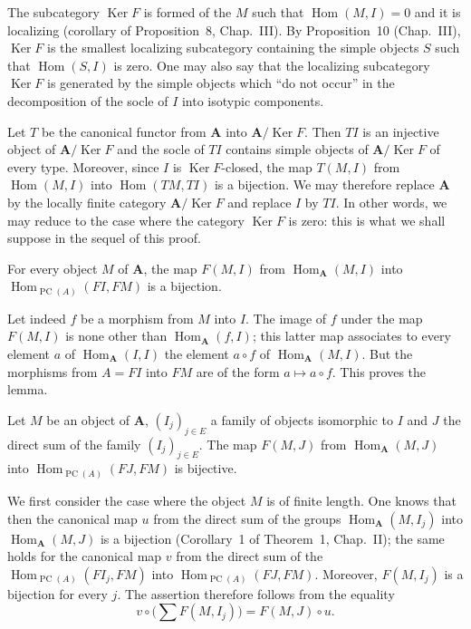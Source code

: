The subcategory $\operatorname{Ker}F$ is formed of the $M$ such that
$\operatorname{Hom}(M,I)=0$ and it is localizing (corollary of
Proposition~8, Chap.~III). By Proposition~10 (Chap.~III),
$\operatorname{Ker}F$ is the smallest localizing subcategory containing
the simple objects $S$ such that $\operatorname{Hom}(S,I)$ is zero. One
may also say that the localizing subcategory $\operatorname{Ker}F$ is
generated by the simple objects which ``do not occur'' in the
decomposition of the socle of $I$ into isotypic components.

Let $T$ be the canonical functor from $\mathbf{A}$ into
$\mathbf{A}/\operatorname{Ker}F$. Then $TI$ is an injective object of
$\mathbf{A}/\operatorname{Ker}F$ and the socle of $TI$ contains simple
objects of $\mathbf{A}/\operatorname{Ker}F$ of every type. Moreover,
since $I$ is $\operatorname{Ker}F$-closed, the map $T(M,I)$ from
$\operatorname{Hom}(M,I)$ into $\operatorname{Hom}(TM,TI)$ is a
bijection. We may therefore replace $\mathbf{A}$ by the locally finite
category $\mathbf{A}/\operatorname{Ker}F$ and replace $I$ by $TI$. In
other words, we may reduce to the case where the category
$\operatorname{Ker}F$ is zero: this is what we shall suppose in the
sequel of this proof.

\begin{lemma}
For every object $M$ of $\mathbf{A}$, the map $F(M,I)$ from
$\operatorname{Hom}_{\mathbf{A}}(M,I)$ into
$\operatorname{Hom}_{\operatorname{PC}(A)}(FI,FM)$ is a bijection.
\end{lemma}

Let indeed $f$ be a morphism from $M$ into $I$. The image of $f$ under
the map $F(M,I)$ is none other than $\operatorname{Hom}_{\mathbf{A}}(f,I)$;
this latter map associates to every element $a$ of
$\operatorname{Hom}_{\mathbf{A}}(I,I)$ the element $a\circ f$ of
$\operatorname{Hom}_{\mathbf{A}}(M,I)$. But the morphisms from $A=FI$
into $FM$ are of the form $a\mapsto a\circ f$. This proves the lemma.

\begin{lemma}
Let $M$ be an object of $\mathbf{A}$, $(I_j)_{j\in E}$ a family of
objects isomorphic to $I$ and $J$ the direct sum of the family
$(I_j)_{j\in E}$. The map $F(M,J)$ from
$\operatorname{Hom}_{\mathbf{A}}(M,J)$ into
$\operatorname{Hom}_{\operatorname{PC}(A)}(FJ,FM)$ is bijective.
\end{lemma}

We first consider the case where the object $M$ is of finite length.
One knows that then the canonical map $u$ from the direct sum of the
groups $\operatorname{Hom}_{\mathbf{A}}(M,I_j)$ into
$\operatorname{Hom}_{\mathbf{A}}(M,J)$ is a bijection (Corollary~1 of
Theorem~1, Chap.~II); the same holds for the canonical map $v$ from the
direct sum of the $\operatorname{Hom}_{\operatorname{PC}(A)}(FI_j,FM)$
into $\operatorname{Hom}_{\operatorname{PC}(A)}(FJ,FM)$. Moreover,
$F(M,I_j)$ is a bijection for every $j$. The assertion therefore
follows from the equality
\[
v\circ\bigl(\sum F(M,I_j)\bigr)=F(M,J)\circ u.
\]

